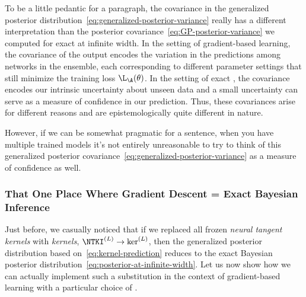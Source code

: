 To be a little pedantic for a paragraph, the covariance in the generalized posterior distribution~\eqref{eq:generalized-posterior-variance} really has a different interpretation than the posterior covariance~\eqref{eq:GP-posterior-variance} we computed for exact  at infinite width. In the setting of gradient-based learning, the covariance of the output encodes the variation in the predictions among networks in the ensemble, each corresponding to different parameter settings that still minimize the training loss $\L_\A(\theta)$. In the setting of exact , 
the covariance encodes our intrinsic uncertainty about unseen data and a small uncertainty can serve as a measure of confidence in our prediction. Thus, these covariances arise for different reasons and are epistemologically quite different in nature. 


However, if we can be somewhat pragmatic for a sentence, when you have multiple trained models it's not entirely unreasonable to try to think of this generalized posterior covariance~\eqref{eq:generalized-posterior-variance} as a measure of confidence
as well.






























\subsubsection{That One Place Where Gradient Descent = Exact Bayesian Inference}


Just before, we casually noticed that if we replaced all frozen \emph{neural tangent kernels} with \emph{kernels}, $\NTKI^{(L)}\to \ker^{(L)}$, then the generalized posterior distribution based on~\eqref{eq:kernel-prediction} reduces to the exact Bayesian posterior distribution~\eqref{eq:posterior-at-infinite-width}. Let us now show how we can actually implement such a substitution in the context of gradient-based learning with a particular choice of .





